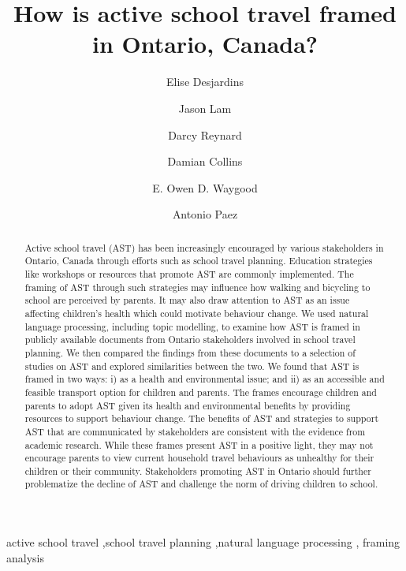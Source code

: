 \documentclass[preprint, 3p,
authoryear]{elsarticle} %
\begin{document}
\begin{frontmatter}

  \title{How is active school travel framed in Ontario, Canada?}
    \author[McMaster University]{Elise Desjardins%
  }
    \author[McMaster University]{Jason Lam%
  }
    \author[University of Alberta]{Darcy Reynard%
  }
    \author[University of Alberta]{Damian Collins%
  }
    \author[Polytechnique Montreal]{E. Owen D. Waygood%
  }
    \author[McMaster University]{Antonio Paez%
  }
  
  \begin{abstract}
  Active school travel (AST) has been increasingly encouraged by various
  stakeholders in Ontario, Canada through efforts such as school travel
  planning. Education strategies like workshops or resources that
  promote AST are commonly implemented. The framing of AST through such
  strategies may influence how walking and bicycling to school are
  perceived by parents. It may also draw attention to AST as an issue
  affecting children's health which could motivate behaviour change. We
  used natural language processing, including topic modelling, to
  examine how AST is framed in publicly available documents from Ontario
  stakeholders involved in school travel planning. We then compared the
  findings from these documents to a selection of studies on AST and
  explored similarities between the two. We found that AST is framed in
  two ways: i) as a health and environmental issue; and ii) as an
  accessible and feasible transport option for children and parents. The
  frames encourage children and parents to adopt AST given its health
  and environmental benefits by providing resources to support behaviour
  change. The benefits of AST and strategies to support AST that are
  communicated by stakeholders are consistent with the evidence from
  academic research. While these frames present AST in a positive light,
  they may not encourage parents to view current household travel
  behaviours as unhealthy for their children or their community.
  Stakeholders promoting AST in Ontario should further problematize the
  decline of AST and challenge the norm of driving children to school.
  \end{abstract}
    \begin{keyword}
    active school travel \sep school travel planning \sep natural
language processing \sep 
    framing analysis
  \end{keyword}
  
 \end{frontmatter}
\end{document}
